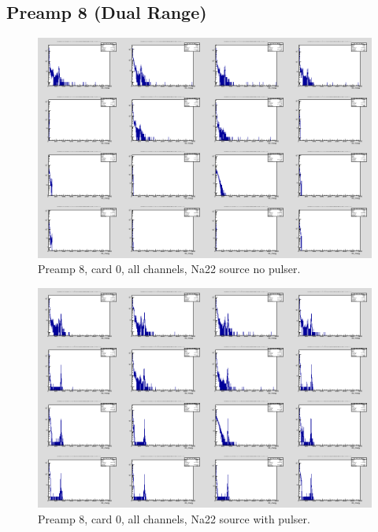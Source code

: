 \documentclass{report}
\begin{document}
\subsection{Preamp 8 (Dual Range)}
\begin{figure}[!htb]
  \includegraphics[width=\linewidth]{dr_latest_test/preamp8_lim_energy_card0_all_no_pulser.png}
  \caption{Preamp 8, card 0, all channels, Na22 source  no pulser.}
\end{figure}
\begin{figure}[!htb]
  \includegraphics[width=\linewidth]{dr_latest_test/preamp8_lim_energy_card0_pulser.png}
  \caption{Preamp 8, card 0, all channels, Na22 source with pulser.}
\end{figure}
\end{document}
